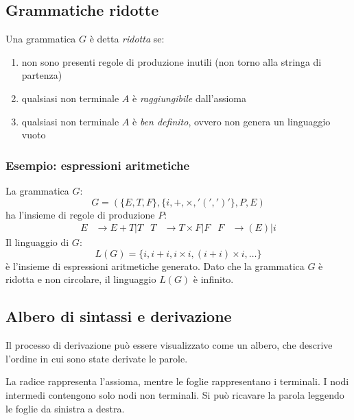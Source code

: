 \documentclass[11pt]{article}
\begin{document}
\subsection{Grammatiche ridotte}
Una grammatica $G$ è detta \textit{ridotta} se:
\begin{enumerate}
    \item non sono presenti regole di produzione inutili (non torno alla stringa di partenza)
    \item qualsiasi non terminale $A$ è \textit{raggiungibile} dall'assioma 
    \item qualsiasi non terminale $A$ è \textit{ben definito}, ovvero non genera un linguaggio vuoto
\end{enumerate}
\subsubsection*{Esempio: espressioni aritmetiche}
La grammatica $G$:
\begin{equation*}
    G=(\{E,T,F\},\{i,+,\times,'(',')'\},P,E)
\end{equation*}
ha l'insieme di regole di produzione $P$:
\begin{align*}
    E&\rightarrow E+T|T & T&\rightarrow T\times F|F & F&\rightarrow (E)|i
\end{align*}
Il linguaggio di $G$:
\begin{equation*}
    L(G)=\{i,i+i,i\times i,(i+i)\times i,\dots\}
\end{equation*}
è l'insieme di espressioni aritmetiche generato. Dato che la grammatica $G$ è ridotta e non circolare, il linguaggio 
$L(G)$ è infinito.
\subsection{Albero di sintassi e derivazione}
Il processo di derivazione può essere visualizzato come un albero, che descrive l'ordine in cui sono state derivate 
le parole. 

La radice rappresenta l'assioma, mentre le foglie rappresentano i terminali. I nodi intermedi contengono solo nodi non 
terminali. Si può ricavare la parola leggendo le foglie da sinistra a destra.
\end{document}
